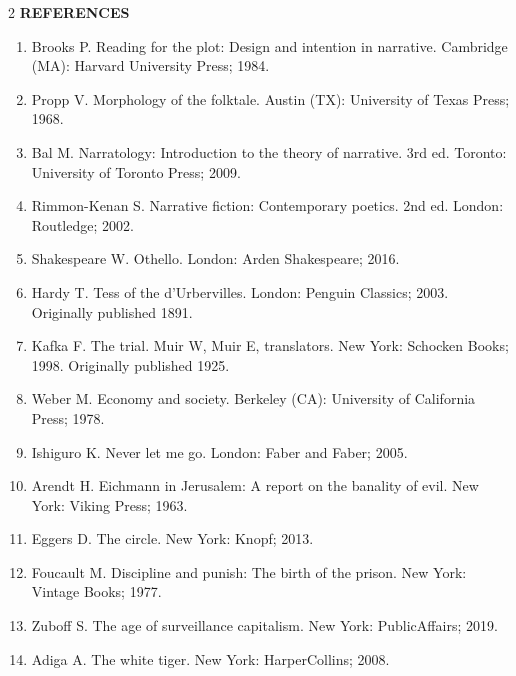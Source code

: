 \documentclass[12pt,a4paper]{article}
\begin{document}
\begin{multicols}{2}
\vspace{8pt}
\noindent
\textcolor{journalblue}{\textbf{REFERENCES}}

\begin{enumerate}[leftmargin=*, itemsep=-2pt, label=\arabic*.]

\item Brooks P. Reading for the plot: Design and intention in narrative. Cambridge (MA): Harvard University Press; 1984.

\item Propp V. Morphology of the folktale. Austin (TX): University of Texas Press; 1968.

\item Bal M. Narratology: Introduction to the theory of narrative. 3rd ed. Toronto: University of Toronto Press; 2009.

\item Rimmon-Kenan S. Narrative fiction: Contemporary poetics. 2nd ed. London: Routledge; 2002.

\item Shakespeare W. Othello. London: Arden Shakespeare; 2016.

\item Hardy T. Tess of the d’Urbervilles. London: Penguin Classics; 2003. Originally published 1891.

\item Kafka F. The trial. Muir W, Muir E, translators. New York: Schocken Books; 1998. Originally published 1925.

\item Weber M. Economy and society. Berkeley (CA): University of California Press; 1978.

\item Ishiguro K. Never let me go. London: Faber and Faber; 2005.

\item Arendt H. Eichmann in Jerusalem: A report on the banality of evil. New York: Viking Press; 1963.

\item Eggers D. The circle. New York: Knopf; 2013.

\item Foucault M. Discipline and punish: The birth of the prison. New York: Vintage Books; 1977.

\item Zuboff S. The age of surveillance capitalism. New York: PublicAffairs; 2019.

\item Adiga A. The white tiger. New York: HarperCollins; 2008.


\end{enumerate}
\end{multicols}
\end{document}
